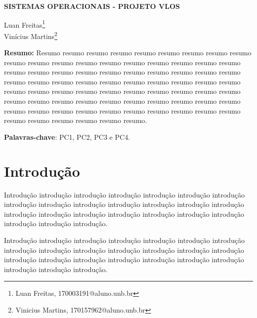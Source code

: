 \documentclass[article,12pt,oneside,a4paper,english,brazil,sumario=tradicional]{abntex2}
\begin{document}
\frenchspacing %

\begin{center}
	\uppercase{\bfseries{Sistemas Operacionais - Projeto VLOS}}
	\vspace{12pt}
\end{center}

\begin{flushright}
	Luan Freitas\footnote{Luan Freitas, 170003191@aluno.unb.br}
	\\
	Vinícius Martins\footnote{Vinicius Martins, 170157962@aluno.unb.br}
	\vspace{12pt}
\end{flushright}

\begin{footnotesize}
\SingleSpacing
\noindent
\small{\textbf{Resumo:}}
\noindent
\small
Resumo resumo resumo resumo resumo resumo resumo resumo resumo resumo resumo resumo resumo resumo resumo resumo resumo resumo resumo resumo resumo resumo resumo resumo resumo resumo resumo resumo resumo resumo resumo resumo resumo resumo resumo resumo resumo resumo resumo resumo resumo resumo resumo resumo resumo resumo resumo resumo resumo resumo resumo resumo resumo resumo resumo resumo resumo resumo resumo resumo resumo resumo resumo resumo resumo resumo resumo resumo resumo resumo resumo resumo resumo resumo resumo.

\noindent
\textbf{Palavras-chave}: PC1, PC2, PC3 e PC4.
\end{footnotesize}

\textual
\pagestyle{simple}


\section{Introdu\c c\~ao}
\label{secIntroducao}
\normalsize
Introdu\c c\~ao introdu\c c\~ao introdu\c c\~ao introdu\c c\~ao introdu\c c\~ao introdu\c c\~ao introdu\c c\~ao introdu\c c\~ao introdu\c c\~ao introdu\c c\~ao introdu\c c\~ao introdu\c c\~ao introdu\c c\~ao introdu\c c\~ao introdu\c c\~ao introdu\c c\~ao introdu\c c\~ao introdu\c c\~ao introdu\c c\~ao introdu\c c\~ao introdu\c c\~ao introdu\c c\~ao introdu\c c\~ao introdu\c c\~ao.

Introdu\c c\~ao introdu\c c\~ao introdu\c c\~ao introdu\c c\~ao introdu\c c\~ao introdu\c c\~ao introdu\c c\~ao introdu\c c\~ao introdu\c c\~ao introdu\c c\~ao introdu\c c\~ao introdu\c c\~ao introdu\c c\~ao introdu\c c\~ao introdu\c c\~ao introdu\c c\~ao introdu\c c\~ao introdu\c c\~ao introdu\c c\~ao introdu\c c\~ao introdu\c c\~ao introdu\c c\~ao introdu\c c\~ao introdu\c c\~ao.
\end{document}
